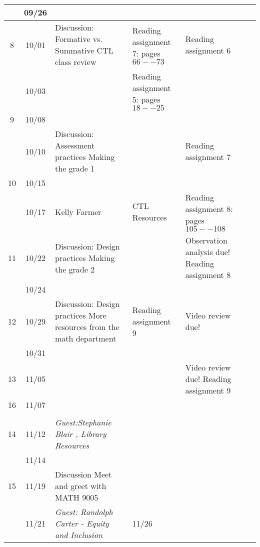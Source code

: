 \begin{longtable}{ |c|c|p{10em}|p{10em}|p{10em}| }
    & 09/26 &  {} & {} & {} \\ \hline

  8 & 10/01 &  {Discussion: Formative vs. Summative CTL class review}  
            & {Reading assignment 7: pages $66--73$} 
            & {Reading assignment 6} \\ \hline

    & 10/03 & {} 
            & {Reading assignment 5: pages $18--25$} & \\ \hline

  9 & 10/08 & 
             &
             & {} \\ \hline

     & 10/10 & {Discussion:  Assessment practices Making the grade 1}   & {}  & {Reading assignment 7} \\ \hline

  10 & 10/15 & {}   & {}  & {} \\ \hline

     & 10/17 & {Kelly Farmer} %
             & {CTL Resources}
             & {Reading assignment 8: pages $105--108$} \\ \hline

  11 & 10/22  & {Discussion:  Design practices Making the grade 2} 
              &  
              & {Observation analysis due! Reading assignment 8} \\ \hline

     & 10/24  & {} &  & {} \\ \hline

  12 & 10/29 &  {Discussion: Design practices More resources from the math department} 
             & {Reading assignment 9}  
             & {Video review due!} \\ \hline

     & 10/31 &  {} & {}  & {} \\ \hline

  13 & 11/05 & {} 
             & 
             & {Video review due! Reading assignment 9} \\ \hline %

  16 & 11/07 & {} & & \\ \hline
             & 
             & {} \\ \hline %

  14 & 11/12 & \textit{Guest:Stephanie Blair , Library Resources}  %
             & 
             & {} \\ \hline %


     & 11/14 & {}
             & 
             & \\ \hline

     
  15 & 11/19 & {Discussion Meet and greet with MATH 9005} 
             & 
             & \\ \hline

     & 11/21 & \textit{Guest: Randolph Carter - Equity and Inclusion} %

     & 11/26 &  {} & {}  & {} \\ \hline
\end{longtable}

